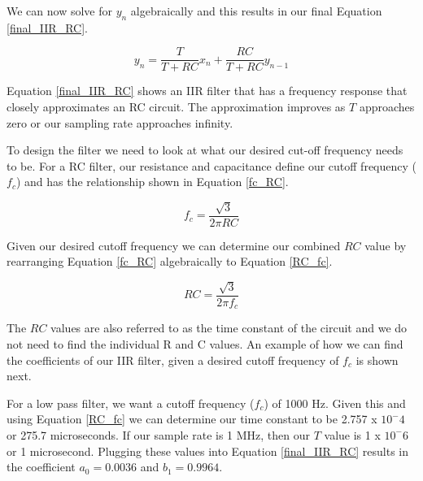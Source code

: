 We can now solve for $y_n$ algebraically and this results in our final Equation \ref{final_IIR_RC}.

\begin{equation}\label{final_IIR_RC}
y_n=\frac{T}{T+RC}x_n+\frac{RC}{T+RC}y_{n-1}
\end{equation}

Equation \ref{final_IIR_RC} shows an IIR filter that has a frequency response that closely approximates an RC circuit.  The approximation improves as $T$ approaches zero or our sampling rate approaches infinity.

To design the filter we need to look at what our desired cut-off frequency needs to be.  For a RC filter, our resistance and capacitance define our cutoff frequency ($f_c$) and has the relationship shown in Equation \ref{fc_RC}.

\begin{equation}\label{fc_RC}
f_c=\frac{\sqrt{3}}{2\pi RC}
\end{equation}

Given our desired cutoff frequency we can determine our combined $RC$ value by rearranging Equation \ref{fc_RC} algebraically to Equation \ref{RC_fc}.

\begin{equation}\label{RC_fc}
RC=\frac{\sqrt{3}}{2\pi f_c}
\end{equation}

The $RC$ values are also referred to as the time constant of the circuit and we do not need to find the individual R and C values.  An example of how we can find the coefficients of our IIR filter, given a desired cutoff frequency of $f_c$ is shown next.  

For a low pass filter, we want a cutoff frequency ($f_c$) of 1000 Hz.  Given this and using Equation \ref{RC_fc} we can determine our time constant to be 2.757 x $10^-4$ or 275.7 microseconds.  If our sample rate is 1 MHz, then our $T$ value is 1 x $10^-6$ or 1 microsecond.  Plugging these values into Equation \ref{final_IIR_RC} results in the coefficient $a_0 = 0.0036$ and $b_1=0.9964$.


